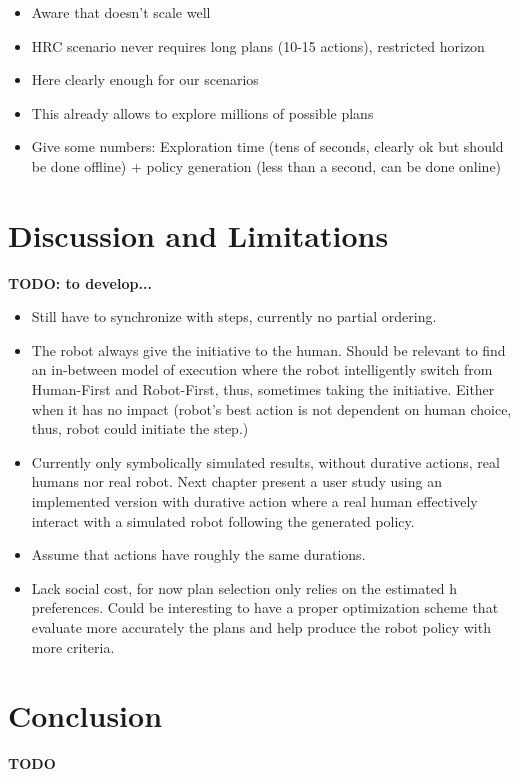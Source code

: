 \begin{itemize}
    \item Aware that doesn't scale well
    \item HRC scenario never requires long plans (10-15 actions), restricted horizon
    \item Here clearly enough for our scenarios
    \item This already allows to explore millions of possible plans
    \item Give some numbers: Exploration time (tens of seconds, clearly ok but should be done offline) + policy generation (less than a second, can be done online) 
\end{itemize}

\section{Discussion and Limitations}

\textbf{TODO: to develop...}

\begin{itemize}
    \item Still have to synchronize with steps, currently no partial ordering. 
    \item The robot always give the initiative to the human. Should be relevant to find an in-between model of execution where the robot intelligently switch from Human-First and Robot-First, thus, sometimes taking the initiative. Either when it has no impact (robot's best action is not dependent on human choice, thus, robot could initiate the step.)
    \item Currently only symbolically simulated results, without durative actions, real humans nor real robot. Next chapter present a user study using an implemented version with durative action where a real human effectively interact with a simulated robot following the generated policy. 
    \item Assume that actions have roughly the same durations.
    \item Lack social cost, for now plan selection only relies on the estimated h preferences. Could be interesting to have a proper optimization scheme that evaluate more accurately the plans and help produce the robot policy with more criteria.
\end{itemize}


\section{Conclusion}

\textbf{TODO}




